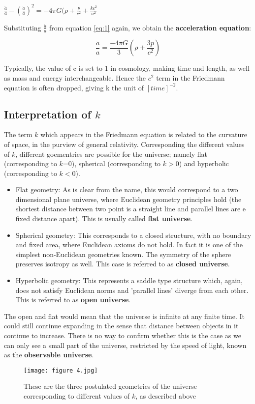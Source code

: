 \begin{center}
    $\frac{\ddot{a}}{a}-(\frac{\dot{a}}{a})^2=-4{\pi}G(\rho+\frac{p}{c^2}+\frac{kc^2}{a^2}$
\end{center}

Substituting $\frac{\ddot{a}}{a}$ from equation \ref{eq:1} again, we obtain the \textbf{acceleration equation}:

\begin{equation}
    \frac{\ddot{a}}{a}=\frac{-4{\pi}G}{3}(\rho+\frac{3p}{c^2})
\end{equation}

Typically, the value of c is set to 1 in cosmology, making time and length, as well as mass and energy interchangeable. Hence the $c^2$ term in the Friedmann equation is often dropped, giving k the unit of $[time]^{-2}$.

\subsection{Interpretation of $k$}

The term $k$ which appears in the Friedmann equation is related to the curvature of space, in the purview of general relativity. Corresponding the different values of $k$, different goementries are possible for the universe; namely flat (corresponding to $k$=0), spherical (corresponding to $k>0$) and hyperbolic (corresponding to $k<0$).

\begin{itemize}
    \item Flat geometry: As is clear from the name, this would correspond to a two dimensional plane universe, where Euclidean geometry principles hold (the shortest distance between two point is a straight line and parallel lines are e fixed distance apart). This is usually called \textbf{flat universe}.
    \item Spherical geometry: This corresponds to a closed structure, with no boundary and fixed area, where Euclidean axioms do not hold. In fact it is one of the simplest non-Euclidean geometries known. The symmetry of the sphere preserves isotropy as well. This case is referred to as \textbf{closed universe}.
    \item Hyperbolic geometry: This represents a saddle type structure which, again, does not satisfy Euclidean norms and 'parallel lines' diverge from each other. This is referred to as \textbf{open universe}.
\end{itemize}

The open and flat would mean that the universe is infinite at any finite time. It could still continue expanding in the sense that distance between objects in it continue to increase. There is no way to confirm whether this is the case as we can only see a small part of the universe, restricted by the speed of light, known as the \textbf{observable universe}.

\begin{figure}[H]
    \centering
    \texttt{[image: figure 4.jpg]}
    \caption{These are the three postulated geometries of the universe corresponding to different values of $k$, as described above}
    \label{fig:matrad}
\end{figure}
